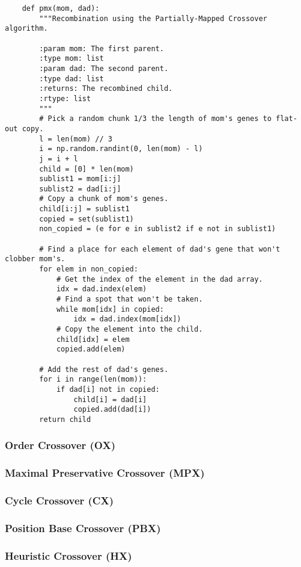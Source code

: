 \documentclass{article}
\begin{document}
\begin{verbatim}
    def pmx(mom, dad):
        """Recombination using the Partially-Mapped Crossover algorithm.

        :param mom: The first parent.
        :type mom: list
        :param dad: The second parent.
        :type dad: list
        :returns: The recombined child.
        :rtype: list
        """
        # Pick a random chunk 1/3 the length of mom's genes to flat-out copy.
        l = len(mom) // 3
        i = np.random.randint(0, len(mom) - l)
        j = i + l
        child = [0] * len(mom)
        sublist1 = mom[i:j]
        sublist2 = dad[i:j]
        # Copy a chunk of mom's genes.
        child[i:j] = sublist1
        copied = set(sublist1)
        non_copied = (e for e in sublist2 if e not in sublist1)

        # Find a place for each element of dad's gene that won't clobber mom's.
        for elem in non_copied:
            # Get the index of the element in the dad array.
            idx = dad.index(elem)
            # Find a spot that won't be taken.
            while mom[idx] in copied:
                idx = dad.index(mom[idx])
            # Copy the element into the child.
            child[idx] = elem
            copied.add(elem)

        # Add the rest of dad's genes.
        for i in range(len(mom)):
            if dad[i] not in copied:
                child[i] = dad[i]
                copied.add(dad[i])
        return child
\end{verbatim}

\subsubsection{Order Crossover (OX)}
\subsubsection{Maximal Preservative Crossover (MPX)}
\subsubsection{Cycle Crossover (CX)}
\subsubsection{Position Base Crossover (PBX)}
\subsubsection{Heuristic Crossover (HX)}
\end{document}
